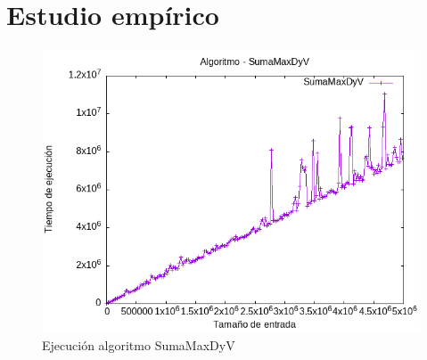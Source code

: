 \documentclass[11pt,openany]{book}
\begin{document}
\section*{Estudio empírico}
\begin{figure}[h]
      \begin{minipage}{0.5\textwidth}
          \centering
          \includegraphics[width=\linewidth]{../Codigos/Graficas/SumaMaxDyV.png}
          \caption{Ejecución algoritmo SumaMaxDyV}
          \label{fig:SumaMaxDyV}
      \end{minipage}
\end{figure}
\newpage
\end{document}
